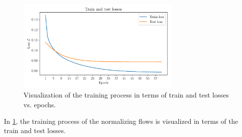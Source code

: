 \documentclass[a4paper,12pt]{report}
\begin{document}
\begin{figure}[h!]
\centering
\includegraphics[width=8cm]{figures/nf-feature-extraction-example-2-loss.pdf}
\caption{Visualization of the training process in terms of train and test losses vs. epochs.}
\label{fig:nf-feature-extraction-example-2-loss}
\end{figure}
In \cref{fig:nf-feature-extraction-example-2-loss}, the training process of the normalizing flows is visualized in terms of the train and test losses.

\end{document}
